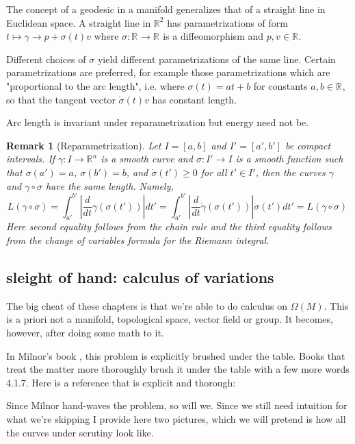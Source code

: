 \documentclass{article}
\newtheorem{rk}{Remark}
\renewcommand{\Rn}[1][n]{\mathbb{R}^{#1}}
\newcommand{\OM}{\Omega(M)}
\begin{document}
The concept of a geodesic in a manifold generalizes that of a straight line in
Euclidean space. A straight line in $\Rn[2]$ has parametrizations of form $t
\mapsto \gamma → p + \sigma(t)v$ where $\sigma : \Rn[] → \Rn[]$ is a
diffeomorphism and $p, v \in \Rn[]$.

Different choices of $\sigma$ yield different parametrizations of the same
line. Certain parametrizations are preferred, for example those
parametrizations which are "proportional to the arc length", i.e. where
$\sigma(t) = at + b$ for constants $a, b \in \Rn[]$, so that the tangent vector
$\dot{\sigma}(t)v$ has constant length.

Arc length is invariant under reparametrization but energy need not be.

\begin{rk}[Reparametrization]
    Let $I = [a, b]$ and $I' = [a', b']$ be compact intervals. If $\gamma : I
    \rightarrow \Rn$ is a smooth curve and $\sigma : I' \rightarrow I$ is a
    smooth function such that $\sigma(a') = a$, $\sigma(b') = b$, and
    $\dot{\sigma}(t') ≥ 0$ for all $t' \in I'$, then the curves $\gamma$ and
    $\gamma \circ \sigma$ have the same length. Namely,
    \[
        L(\gamma  \circ \sigma)
        = \int_{a'}^{b'} \left|\frac{d}{dt} \gamma(\sigma(t')) \right| dt'
        = \int_{a'}^{b'} \left|\frac{d}{dt} \dot{\gamma}(\sigma(t')) \right| \dot{\sigma}(t') dt'
        = L(\gamma  \circ \sigma)
        \
    \]
    Here second equality follows from the chain rule and the third equality
    follows from the change of variables formula for the Riemann integral.
\end{rk}




\subsection{sleight of hand: calculus of variations}

The big cheat of these chapters is that we're able to do calculus on $\OM$.
This is a priori not a manifold, topological space, vector field or group.
It becomes, however, after doing some math to it.

In Milnor's book \cite{milnor}, this problem is explicitly brushed under the table.
Books that treat the matter more thoroughly brush it under the table with a few more words
\cite{salamon} 4.1.7.
Here is a reference that is explicit and thorough: \cite{lee}

Since Milnor hand-waves the problem, so will we. Since we still need intuition for what we're
skipping I provide here two pictures, which we will pretend is how all the curves under scrutiny
look like.
\end{document}
